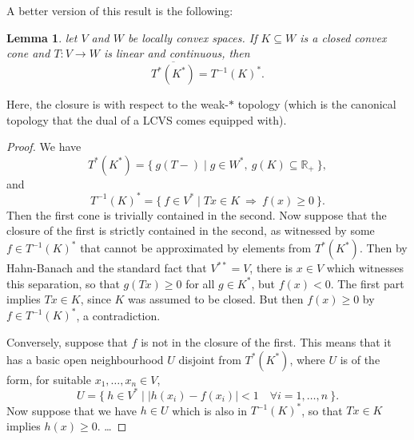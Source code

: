 \documentclass[a4paper,12pt]{scrartcl}
\numberwithin{equation}{section}
\theoremstyle{plain}
\newtheorem{lemma}[thm]{Lemma}
\theoremstyle{definition}
\newcommand{\R}{\mathbb{R}}
\DeclareMathOperator{\1}{\mathbbm{1}}
\DeclareMathOperator{\2}{\mathbbm{2}}
\begin{document}
A better version of this result is the following:

\begin{lemma}
let $V$ and $W$ be locally convex spaces. If $K\subseteq W$ is a closed convex cone and $T : V\to W$ is linear and continuous, then
\[
	\overline{T^*(K^*)} = T^{-1}(K)^*.
\]
\end{lemma}

Here, the closure is with respect to the weak-$*$ topology (which is the canonical topology that the dual of a LCVS comes equipped with).

\begin{proof}
We have
\[
	T^*(K^*) = \{\: g(T-) \mid g\in W^*,\: g(K)\subseteq\R_+ \:\},
\]
and
\[
	T^{-1}(K)^* = \{\: f\in V^* \mid Tx\in K \:\Rightarrow\: f(x) \geq 0 \:\}.
\]
Then the first cone is trivially contained in the second. Now suppose that the closure of the first is strictly contained in the second, as witnessed by some $f\in T^{-1}(K)^*$ that cannot be approximated by elements from $T^*(K^*)$. Then by Hahn-Banach and the standard fact that $V^{**} = V$, there is $x\in V$ which witnesses this separation, so that $g(Tx) \geq 0$ for all $g\in K^*$, but $f(x) < 0$. The first part implies $Tx\in K$, since $K$ was assumed to be closed. But then $f(x) \geq 0$ by $f\in T^{-1}(K)^*$, a contradiction.


Conversely, suppose that $f$ is not in the closure of the first. This means that it has a basic open neighbourhood $U$ disjoint from $T^*(K^*)$, where $U$ is of the form, for suitable $x_1,\ldots,x_n\in V$,
\[
	U = \{\: h\in V^* \mid |h(x_i) - f(x_i)| < 1 \quad\forall i=1,\ldots,n \:\}.
\]
Now suppose that we have $h\in U$ which is also in $T^{-1}(K)^*$, so that $Tx\in K$ implies $h(x) \geq 0$. \ldots
\end{proof}
\end{document}
